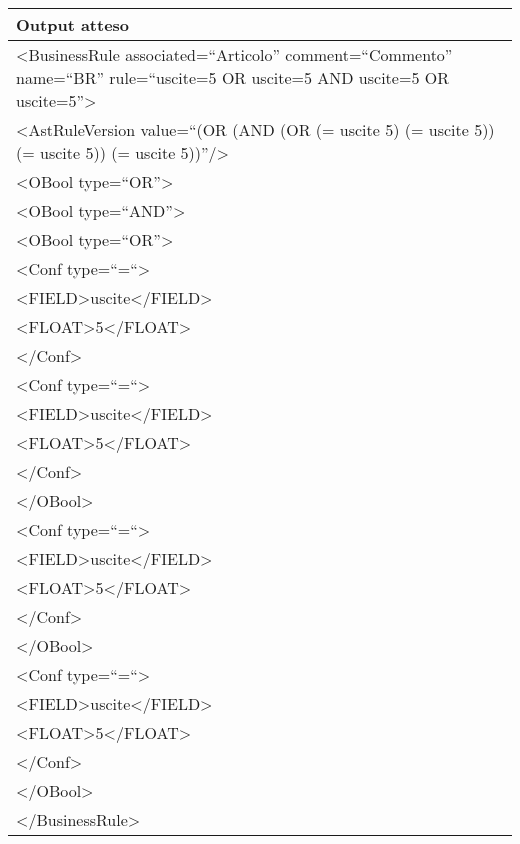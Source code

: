 \begin{center}
\begin{tabular}{|p{11cm}|} \hline
\textbf{Output atteso}\\ \hline
\textless BusinessRule associated=``Articolo'' comment=``Commento'' name=``BR'' rule=``uscite=5 OR uscite=5  AND  uscite=5 OR uscite=5''\textgreater\\
 \textless AstRuleVersion value=``(OR (AND (OR (= uscite 5) (= uscite 5)) (= uscite 5)) (= uscite 5))''/\textgreater \\
\textless OBool type=``OR''\textgreater\\
\textless OBool type=``AND''\textgreater\\
\textless OBool type=``OR''\textgreater\\
\textless Conf type=``=``\textgreater \\
\textless FIELD\textgreater uscite\textless /FIELD\textgreater\\
 \textless FLOAT\textgreater 5\textless /FLOAT\textgreater\\
 \textless /Conf\textgreater\\
\textless Conf type=``=``\textgreater \\
\textless FIELD\textgreater uscite\textless /FIELD\textgreater\\
 \textless FLOAT\textgreater 5\textless /FLOAT\textgreater\\
 \textless /Conf\textgreater\\
\textless /OBool\textgreater \\
\textless Conf type=``=``\textgreater \\
\textless FIELD\textgreater uscite\textless /FIELD\textgreater\\
 \textless FLOAT\textgreater 5\textless /FLOAT\textgreater\\
 \textless /Conf\textgreater\\
\textless /OBool\textgreater \\
\textless Conf type=``=``\textgreater \\
\textless FIELD\textgreater uscite\textless /FIELD\textgreater\\
 \textless FLOAT\textgreater 5\textless /FLOAT\textgreater\\
 \textless /Conf\textgreater\\
\textless /OBool\textgreater \\
\textless /BusinessRule\textgreater \\
 \hline
\end{tabular} \\
\end{center}

